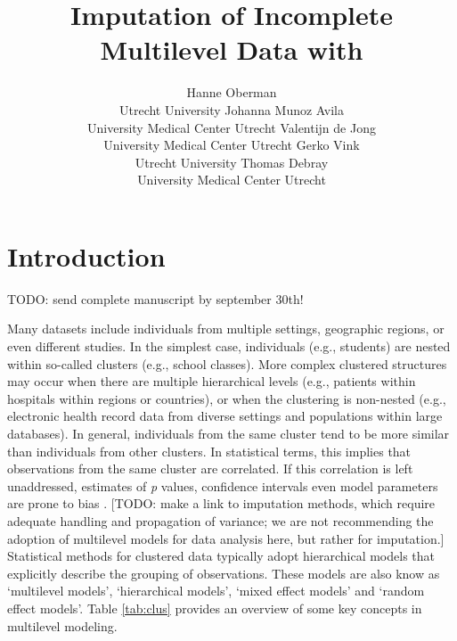 \documentclass[
]{jss}
\author{
Hanne Oberman\\Utrecht University \And Johanna Munoz Avila\\University
Medical Center Utrecht \AND Valentijn de Jong\\University Medical
Center Utrecht \And Gerko Vink\\Utrecht University \AND Thomas
Debray\\University Medical Center Utrecht
}
\title{Imputation of Incomplete Multilevel Data with \pkg{mice}}
\begin{document}
\hypertarget{introduction}{%
\section{Introduction}\label{introduction}}

TODO: send complete manuscript by september 30th!

Many datasets include individuals from multiple settings, geographic
regions, or even different studies. In the simplest case, individuals
(e.g., students) are nested within so-called clusters (e.g., school
classes). More complex clustered structures may occur when there are
multiple hierarchical levels (e.g., patients within hospitals within
regions or countries), or when the clustering is non-nested (e.g.,
electronic health record data from diverse settings and populations
within large databases). In general, individuals from the same cluster
tend to be more similar than individuals from other clusters. In
statistical terms, this implies that observations from the same cluster
are correlated. If this correlation is left unaddressed, estimates of
\emph{p} values, confidence intervals even model parameters are prone to
bias \citep{loca01}. {[}TODO: make a link to imputation methods, which
require adequate handling and propagation of variance; we are not
recommending the adoption of multilevel models for data analysis here,
but rather for imputation.{]} Statistical methods for clustered data
typically adopt hierarchical models that explicitly describe the
grouping of observations. These models are also know as `multilevel
models', `hierarchical models', `mixed effect models' and `random effect
models'. Table \ref{tab:clus} provides an overview of some key concepts
in multilevel modeling.
\end{document}
